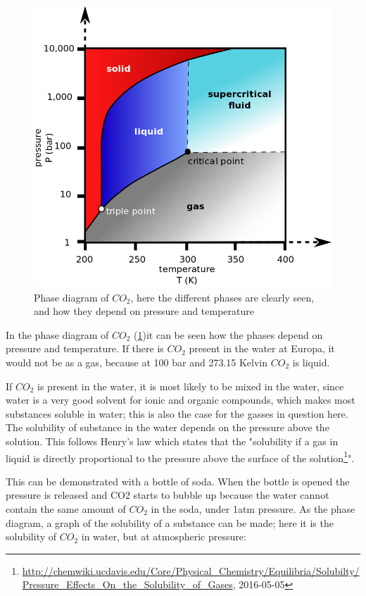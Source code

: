 \begin{figure}[htb]
  \centering
  \includegraphics[scale=0.4]{figures/GasDetectionAgge/CO2PhaseDiagram}
  \caption{Phase diagram of $CO_2$, here the different phases are clearly seen, and how they depend on pressure and temperature}
  \label{fig:PhaseDiagramCO2}
\end{figure}

In the phase diagram of $CO_2$ (\ref{fig:PhaseDiagramCO2})it can be seen how the phases depend on pressure and temperature. If there is $CO_2$ present in the water at Europa, it would not be as a gas, because at 100 bar and 273.15 Kelvin $CO_2$ is liquid.

If $CO_2$ is present in the water, it is most likely to be mixed in the water, since water is a very good solvent for ionic and organic compounds, which makes most substances soluble in water; this is also the case for the gasses in question here. The solubility of substance in the water depends on the pressure above the solution. This follows Henry's law which states that the "solubility if a gas in liquid is directly proportional to the pressure above the surface of the solution\footnote{\url{http://chemwiki.ucdavis.edu/Core/Physical_Chemistry/Equilibria/Solubilty/Pressure_Effects_On_the_Solubility_of_Gases}, 2016-05-05}".

This can be demonstrated with a bottle of soda. When the bottle is opened the pressure is released and CO2 starts to bubble up because the water cannot contain the same amount of $CO_2$ in the soda, under 1atm pressure.
As the phase diagram, a graph of the solubility of a substance can be made; here it is the solubility of $CO_2$ in water, but at atmospheric pressure:

